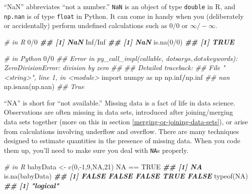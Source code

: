 \documentclass[
  12pt,
  krantz2]{krantz}
\makeatletter
\newenvironment{Shaded}{\begin{snugshade}}{\end{snugshade}}
\newcommand{\CommentTok}[1]{\textcolor[rgb]{0.37,0.37,0.37}{\textit{#1}}}
\newcommand{\ConstantTok}[1]{\textcolor[rgb]{0,0,0}{#1}}
\newcommand{\DecValTok}[1]{\textcolor[rgb]{0.06,0.06,0.06}{#1}}
\newcommand{\DocumentationTok}[1]{\textcolor[rgb]{0.37,0.37,0.37}{\textbf{\textit{#1}}}}
\newcommand{\FunctionTok}[1]{\textcolor[rgb]{0,0,0}{#1}}
\newcommand{\ImportTok}[1]{#1}
\newcommand{\NormalTok}[1]{#1}
\newcommand{\OperatorTok}[1]{\textcolor[rgb]{0.43,0.43,0.43}{\textbf{#1}}}
\newcommand{\OtherTok}[1]{\textcolor[rgb]{0.37,0.37,0.37}{#1}}
\newcommand{\SpecialCharTok}[1]{\textcolor[rgb]{0,0,0}{#1}}
\newenvironment{kframe}{%
\medskip{}
\setlength{\fboxsep}{.8em}
 \def\at@end@of@kframe{}%
 \ifinner\ifhmode%
  \def\at@end@of@kframe{\end{minipage}}%
  \begin{minipage}{\columnwidth}%
 \fi\fi%
 \def\FrameCommand##1{\hskip\@totalleftmargin \hskip-\fboxsep
 \colorbox{shadecolor}{##1}\hskip-\fboxsep
     \hskip-\linewidth \hskip-\@totalleftmargin \hskip\columnwidth}%
 \MakeFramed {\advance\hsize-\width
   \@totalleftmargin\z@ \linewidth\hsize
   \@setminipage}}%
 {\par\unskip\endMakeFramed%
 \at@end@of@kframe}
\renewenvironment{Shaded}{\begin{kframe}}{\end{kframe}}
\makeatother
\begin{document}
``NaN'' abbreviates ``not a number.'' \texttt{NaN} is an object of type \texttt{double} in R, and \texttt{np.nan} is of type \texttt{float} in Python. It can come in handy when you (deliberately or accidentally) perform undefined calculations such as \(0/0\) or \(\infty / -\infty\).

\begin{Shaded}
\begin{Highlighting}[]
\CommentTok{\# in R}
\DecValTok{0}\SpecialCharTok{/}\DecValTok{0}
\DocumentationTok{\#\# [1] NaN}
\ConstantTok{Inf}\SpecialCharTok{/}\ConstantTok{Inf}
\DocumentationTok{\#\# [1] NaN}
\FunctionTok{is.na}\NormalTok{(}\DecValTok{0}\SpecialCharTok{/}\DecValTok{0}\NormalTok{)}
\DocumentationTok{\#\# [1] TRUE}
\end{Highlighting}
\end{Shaded}

\begin{Shaded}
\begin{Highlighting}[]
\CommentTok{\# in Python}
\DecValTok{0}\OperatorTok{/}\DecValTok{0}
\CommentTok{\#\# Error in py\_call\_impl(callable, dots$args, dots$keywords): ZeroDivisionError: division by zero}
\CommentTok{\#\# }
\CommentTok{\#\# Detailed traceback:}
\CommentTok{\#\#   File "\textless{}string\textgreater{}", line 1, in \textless{}module\textgreater{}}
\ImportTok{import}\NormalTok{ numpy }\ImportTok{as}\NormalTok{ np}
\NormalTok{np.inf}\OperatorTok{/}\NormalTok{np.inf}
\CommentTok{\#\# nan}
\NormalTok{np.isnan(np.nan)}
\CommentTok{\#\# True}
\end{Highlighting}
\end{Shaded}

``NA'' is short for ``not available.'' Missing data is a fact of life in data science. Observations are often missing in data sets, introduced after joining/merging data sets together (more on this in section \ref{merging-or-joining-data-sets}), or arise from calculations involving underflow and overflow. There are many techniques designed to estimate quantities in the presence of missing data. When you code them up, you'll need to make sure you deal with \texttt{NA}s properly.

\begin{Shaded}
\begin{Highlighting}[]
\CommentTok{\# in R}
\NormalTok{babyData }\OtherTok{\textless{}{-}} \FunctionTok{c}\NormalTok{(}\DecValTok{0}\NormalTok{,}\SpecialCharTok{{-}}\DecValTok{1}\NormalTok{,}\DecValTok{9}\NormalTok{,}\ConstantTok{NA}\NormalTok{,}\DecValTok{21}\NormalTok{)}
\ConstantTok{NA} \SpecialCharTok{==} \ConstantTok{TRUE} 
\DocumentationTok{\#\# [1] NA}
\FunctionTok{is.na}\NormalTok{(babyData)}
\DocumentationTok{\#\# [1] FALSE FALSE FALSE  TRUE FALSE}
\FunctionTok{typeof}\NormalTok{(}\ConstantTok{NA}\NormalTok{)}
\DocumentationTok{\#\# [1] "logical"}
\end{Highlighting}
\end{Shaded}
\end{document}
